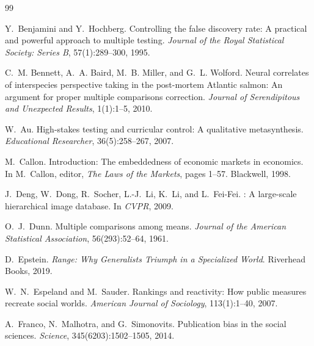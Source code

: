 \documentclass{article}
\begin{document}


\begin{thebibliography}{99}

Y.~Benjamini and Y.~Hochberg.
\newblock Controlling the false discovery rate: A practical and powerful approach to multiple testing.
\newblock \emph{Journal of the Royal Statistical Society: Series B}, 57(1):289--300, 1995.

C.~M. Bennett, A.~A. Baird, M.~B. Miller, and G.~L. Wolford.
\newblock Neural correlates of interspecies perspective taking in the post-mortem {Atlantic} salmon: An argument for proper multiple comparisons correction.
\newblock \emph{Journal of Serendipitous and Unexpected Results}, 1(1):1--5, 2010.

W.~Au.
\newblock High-stakes testing and curricular control: A qualitative metasynthesis.
\newblock \emph{Educational Researcher}, 36(5):258--267, 2007.

M.~Callon.
\newblock Introduction: The embeddedness of economic markets in economics.
\newblock In M.~Callon, editor, \emph{The Laws of the Markets}, pages 1--57. Blackwell, 1998.

J.~Deng, W.~Dong, R.~Socher, L.-J.~Li, K.~Li, and L.~Fei-Fei.
: A large-scale hierarchical image database.
\newblock In \emph{CVPR}, 2009.

O.~J.~Dunn.
\newblock Multiple comparisons among means.
\newblock \emph{Journal of the American Statistical Association}, 56(293):52--64, 1961.

D.~Epstein.
\newblock \emph{Range: Why Generalists Triumph in a Specialized World}.
\newblock Riverhead Books, 2019.

W.~N.~Espeland and M.~Sauder.
\newblock Rankings and reactivity: How public measures recreate social worlds.
\newblock \emph{American Journal of Sociology}, 113(1):1--40, 2007.

A.~Franco, N.~Malhotra, and G.~Simonovits.
\newblock Publication bias in the social sciences.
\newblock \emph{Science}, 345(6203):1502--1505, 2014.


\end{thebibliography}
\end{document}
